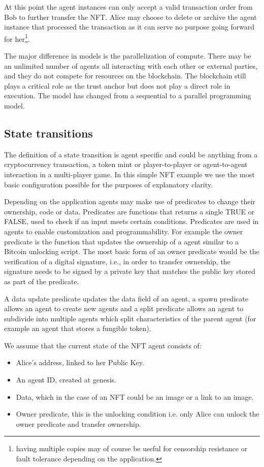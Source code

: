\documentclass{article}
\begin{document}
At this point the agent instances can only accept a valid transaction order from Bob to further transfer the NFT. Alice may choose to delete or archive the agent instance that processed the transaction as it can serve no purpose going forward for her\footnote{having multiple copies may of course be useful for censorship resistance or fault tolerance depending on the application.}.

The major difference in models is the parallelization of compute. There may be an unlimited number of agents all interacting with each other or external parties, and they do not compete for resources on the blockchain. The blockchain still plays a critical role as the trust anchor but does not play a direct role in execution. The model has changed from a sequential to a parallel programming model.

\subsection{State transitions}

The definition of a state transition is agent specific and could be anything from a cryptocurrency transaction, a token mint or player-to-player or agent-to-agent interaction in a multi-player game. In this simple NFT example we use the most basic configuration possible for the purposes of explanatory clarity.

Depending on the application agents may make use of predicates to change their ownership, code or data. Predicates are functions that returns a single TRUE or FALSE, used to check if an input meets certain conditions. Predicates are used in agents to enable customization and programmability. For example the owner predicate is the function that updates the ownership of a agent similar to a Bitcoin unlocking script. The most basic form of an owner predicate would be the verification of a digital signature, i.e., in order to transfer ownership, the signature needs to be signed by a private key that matches the public key stored as part of the predicate.

A data update predicate updates the data field of an agent, a spawn predicate allows an agent to create new agents and a split predicate allows an agent to subdivide into multiple agents which split characteristics of the parent agent (for example an agent that stores a fungible token).

We assume that the current state of the NFT agent consists of:

\begin{itemize}
    \item Alice's address, linked to her Public Key.
    \item An agent ID, created at genesis.
    \item Data, which in the case of an NFT could be an image or a link to an image.
    \item Owner  predicate, this is the unlocking condition i.e. only Alice can unlock the owner predicate and transfer ownership.
\end{itemize}
\end{document}

